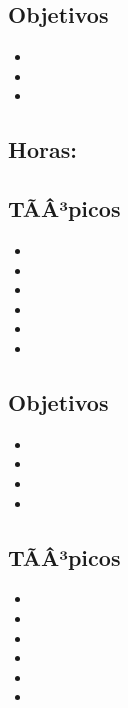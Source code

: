 \subsection*{Objetivos}
\begin{itemize}
	\item \ARSEISObjUNO
	\item \ARSEISObjDOS
	\item \ARSEISObjTRES
\end{itemize}

\subsection{\ARSIETEDef}\label{sec:BOK-AR7}
\subsection*{Horas: \ARSIETEHours}

\subsection*{TÃÂ³picos}
\begin{itemize}
	\item \ARSIETETopicIntroduccion
	\item \ARSIETETopicArquitectura
	\item \ARSIETETopicInterconeccion
	\item \ARSIETETopicSistemas
	\item \ARSIETETopicCoherencia
	\item \ARSIETETopicModelos
\end{itemize}

\subsection*{Objetivos}
\begin{itemize}
	\item \ARSIETEObjUNO
	\item \ARSIETEObjDOS
	\item \ARSIETEObjTRES
	\item \ARSIETEObjCUATRO
\end{itemize}

\subsection{\AROCHODef}\label{sec:BOK-AR8}

\subsection*{TÃÂ³picos}
\begin{itemize}
	\item \AROCHOTopicArquitectura
	\item \AROCHOTopicPrediccion
	\item \AROCHOTopicPrebusqueda
	\item \AROCHOTopicEjecucion
	\item \AROCHOTopicMulti
	\item \AROCHOTopicEscalabilidad
\end{itemize}

